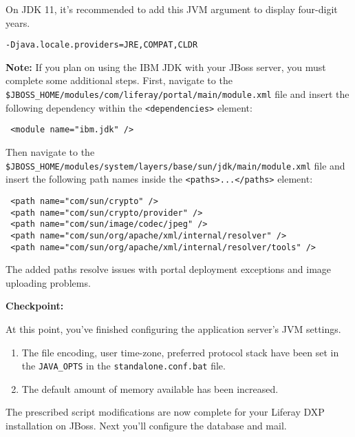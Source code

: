 On JDK 11, it's recommended to add this JVM argument to display
four-digit years.

\begin{verbatim}
-Djava.locale.providers=JRE,COMPAT,CLDR
\end{verbatim}

\noindent\hrulefill

\textbf{Note:} If you plan on using the IBM JDK with your JBoss server,
you must complete some additional steps. First, navigate to the
\texttt{\$JBOSS\_HOME/modules/com/liferay/portal/main/module.xml} file
and insert the following dependency within the
\texttt{\textless{}dependencies\textgreater{}} element:

\begin{verbatim}
 <module name="ibm.jdk" />
\end{verbatim}

Then navigate to the
\texttt{\$JBOSS\_HOME/modules/system/layers/base/sun/jdk/main/module.xml}
file and insert the following path names inside the
\texttt{\textless{}paths\textgreater{}...\textless{}/paths\textgreater{}}
element:

\begin{verbatim}
 <path name="com/sun/crypto" />
 <path name="com/sun/crypto/provider" />
 <path name="com/sun/image/codec/jpeg" />
 <path name="com/sun/org/apache/xml/internal/resolver" />
 <path name="com/sun/org/apache/xml/internal/resolver/tools" />
\end{verbatim}

The added paths resolve issues with portal deployment exceptions and
image uploading problems.

\noindent\hrulefill

\textbf{Checkpoint:}

At this point, you've finished configuring the application server's JVM
settings.

\begin{enumerate}
\def\labelenumi{\arabic{enumi}.}
\item
  The file encoding, user time-zone, preferred protocol stack have been
  set in the \texttt{JAVA\_OPTS} in the \texttt{standalone.conf.bat}
  file.
\item
  The default amount of memory available has been increased.
\end{enumerate}

The prescribed script modifications are now complete for your Liferay
DXP installation on JBoss. Next you'll configure the database and mail.


